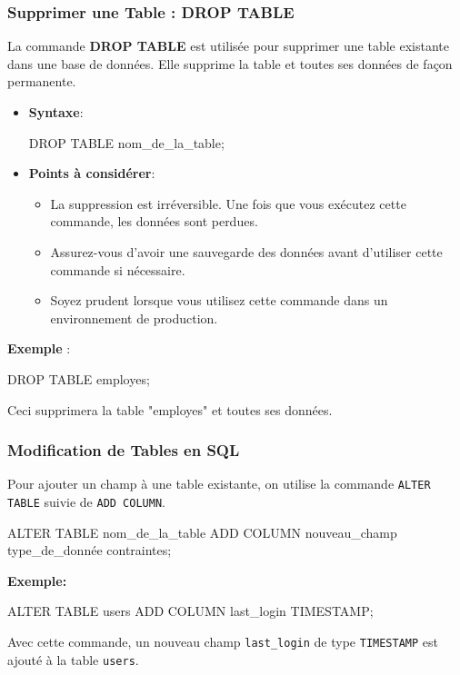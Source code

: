 \begin{frame}
  \frametitle{Supprimer une Table : DROP TABLE}

  La commande \textbf{DROP TABLE} est utilisée pour supprimer une table existante dans une base de données. Elle supprime la table et toutes ses données de façon permanente.

  \begin{itemize}
    \item \textbf{Syntaxe}:
      \begin{semiverbatim}
DROP TABLE nom\_de\_la\_table;
      \end{semiverbatim}

    \item \textbf{Points à considérer}:
      \begin{itemize}
        \item La suppression est \alert{irréversible}. Une fois que vous exécutez cette commande, les données sont perdues.
        \item Assurez-vous d'avoir une sauvegarde des données avant d'utiliser cette commande si nécessaire.
        \item Soyez prudent lorsque vous utilisez cette commande dans un environnement de production.
      \end{itemize}

  \end{itemize}

  \textbf{Exemple} :
      \begin{semiverbatim}
DROP TABLE employes;
      \end{semiverbatim}
  Ceci supprimera la table "employes" et toutes ses données.

\end{frame}


\begin{frame}[fragile]
  \frametitle{Modification de Tables en SQL}

  Pour ajouter un champ à une table existante, on utilise la commande \texttt{ALTER TABLE} suivie de \texttt{ADD COLUMN}.

  \begin{semiverbatim}
ALTER TABLE nom\_de\_la\_table
ADD COLUMN nouveau\_champ type\_de\_donnée contraintes;
  \end{semiverbatim}

  \textbf{Exemple:}
  \begin{semiverbatim}
ALTER TABLE users
ADD COLUMN last\_login TIMESTAMP;
  \end{semiverbatim}

  Avec cette commande, un nouveau champ \texttt{last\_login} de type \texttt{TIMESTAMP} est ajouté à la table \texttt{users}.

\end{frame}

